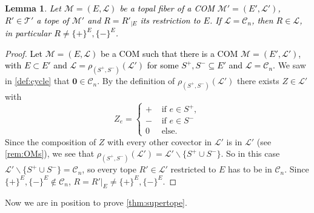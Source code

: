 \documentclass[12pt]{amsart}
\def\Tscr{{\mathcal T}}
\def\Lscr{{\mathcal L}}
\def\M{{\mathcal M}}
\theoremstyle{plain}
\newtheorem{Lemma}{Lemma}
\numberwithin{Lemma}{\DefaultNumberTheoremWithin}
\numberwithin{Claim}{\DefaultNumberTheoremWithin}
\numberwithin{Theorem}{\DefaultNumberTheoremWithin}
\numberwithin{Corollary}{\DefaultNumberTheoremWithin}
\numberwithin{Proposition}{\DefaultNumberTheoremWithin}
\numberwithin{Conjecture}{\DefaultNumberTheoremWithin}
\numberwithin{Situation}{\DefaultNumberTheoremWithin}
\numberwithin{Note}{\DefaultNumberTheoremWithin}
\theoremstyle{definition}
\numberwithin{Definition}{\DefaultNumberTheoremWithin}
\theoremstyle{definition}
\numberwithin{Question}{\DefaultNumberTheoremWithin}
\theoremstyle{definition}
\numberwithin{Problem}{\DefaultNumberTheoremWithin}
\theoremstyle{remark} \newtheorem{Remark}{Remark}
\numberwithin{Remark}{\DefaultNumberTheoremWithin}
\theoremstyle{remark}
\numberwithin{Example}{\DefaultNumberTheoremWithin}
\numberwithin{Case}{Lemma}
\numberwithin{Step}{Lemma}
\newcommand{\new}[1]{\textcolor{black}{#1}}
\begin{document}
\begin{Lemma} \label{lem:Cn} 
\new{Let $\M=(E,\mathcal{L})$ be a topal fiber of a COM $\M'=(E',\mathcal{L'})$, $R'\in \Tscr'$ a tope of $\M'$ and $R=R'_{|E}$ its restriction to $E$. If $\mathcal{L} = \mathcal{C}_n$, then $R \in \mathcal{L}$, in particular $R \neq \{+\}^E, \{-\}^E$.}

\end{Lemma}

\begin{proof}\new{Let $\M=(E,\mathcal{L})$ be a COM such that there is a COM $\M=(E',\mathcal{L'})$, with $E\subset E'$ and $\mathcal{L} = \rho_{(S^+,S^-)}(\Lscr')$ for some $S^+,S^- \subseteq E'$ and $\mathcal{L}=\mathcal{C}_n$.}
We saw in \ref{def:cycle} that $\mathbf{0} \in \mathcal{C}_n$. By the definition of $\rho_{(S^+,S^-)}(\Lscr')$ there exists $Z\in \mathcal{L}'$ with
$$Z_e = \begin{cases}
                        + & \text{ if } e \in S^+,\\
                        - & \text{ if } e \in S^-\\
                        0 & \text{ else. }
                       \end{cases} 
                $$
Since the composition of $Z$ with every other covector in $\mathcal{L}'$ is in $\mathcal{L}'$ (see \ref{rem:OMs}), we see that $\rho_{(S^+,S^-)}(\Lscr') = \mathcal{L}'\backslash \{S^+ \cup S^-\}$. So in this case $\mathcal{L}'\backslash \{S^+ \cup S^-\} = \mathcal{C}_n$, so every tope $R' \in \mathcal{L}'$ restricted to $E$ has to be in $\mathcal{C}_n$. Since $\{+\}^E, \{-\}^E \notin \mathcal{C}_n$, $R=R'|_E \neq \{+\}^E, \{-\}^E$. 


\end{proof}

Now we are in position to prove \ref{thm:supertope}.
\end{document}
